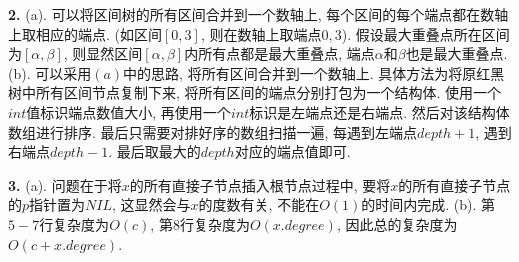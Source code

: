 \documentclass{article}
\begin{document}
	\begin{solution}\textnormal{\textbf{2.}}
		(a). 可以将区间树的所有区间合并到一个数轴上, 每个区间的每个端点都在数轴上取相应的端点.
		(如区间$[0, 3]$, 则在数轴上取端点$0, 3$).\newline
		假设最大重叠点所在区间为$[\alpha, \beta]$, 则显然区间$[\alpha, \beta]$内所有点都是最大重叠点, 端点$\alpha$和$\beta$也是最大重叠点.\newline
		(b). 可以采用$(a)$中的思路, 将所有区间合并到一个数轴上. 具体方法为将原红黑树中所有区间节点复制下来, 将所有区间的端点分别打包为一个结构体.
		使用一个$int$值标识端点数值大小, 再使用一个$int$标识是左端点还是右端点. 然后对该结构体数组进行排序.\newline
		最后只需要对排好序的数组扫描一遍, 每遇到左端点$depth + 1$, 遇到右端点$depth - 1$. 最后取最大的$depth$对应的端点值即可.
	\end{solution}
	\begin{solution}\textnormal{\textbf{3.}}
		(a). 问题在于将$x$的所有直接子节点插入根节点过程中, 要将$x$的所有直接子节点的$p$指针置为$NIL$,
		这显然会与$x$的度数有关, 不能在$O(1)$的时间内完成.\newline
		(b). 第$5-7$行复杂度为$O(c)$, 第$8$行复杂度为$O(x.degree)$, 因此总的复杂度为$O(c + x.degree)$.
	\end{solution}
\end{document}
